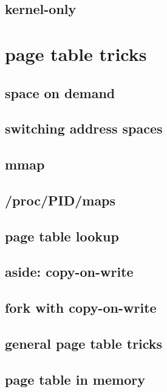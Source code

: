 \subsection{kernel-only}


\section{page table tricks}
\subsection{space on demand}


\subsection{switching address spaces}


\subsection{mmap}


\subsection{/proc/PID/maps}


\subsection{page table lookup}
 

\subsection{aside: copy-on-write}


\subsection{fork with copy-on-write}



\subsection{general page table tricks}


\subsection{page table in memory}



